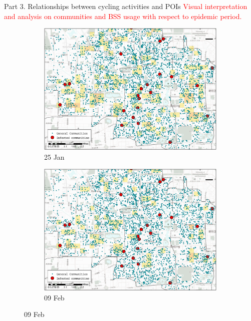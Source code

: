 \documentclass[preprints,ijgi,submit,moreauthors]{Definitions/mdpi}
\begin{document}
Part 3. Relationships between cycling activities and POIs
\textcolor{red}{Visual interpretation and analysis on communities and BSS usage with respect to epidemic period.}
\begin{figure}[H]
    \centering
    \begin{subfigure}{.45\textwidth}
        \includegraphics[width=\textwidth]{Figures/Relation_with_POIs/POI_resD2020_01_25.eps}
        \caption{25 Jan}
    \end{subfigure}
    \begin{subfigure}{.45\textwidth}
        \includegraphics[width=\textwidth]{Figures/Relation_with_POIs/POI_resD2020_02_09.eps}
        \caption{09 Feb}
    \end{subfigure}


\end{figure}
\end{document}
